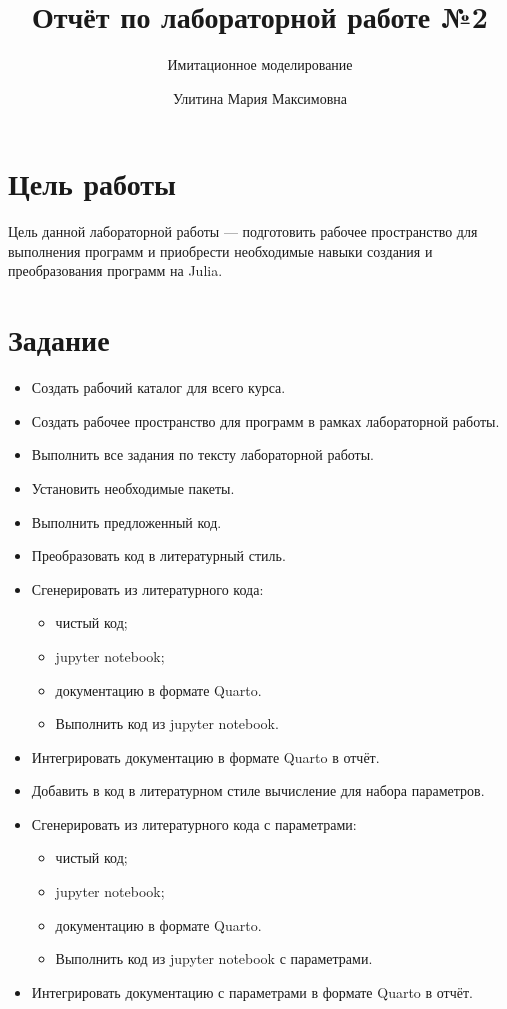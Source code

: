\documentclass[
  english,
  russian,
  12pt,
  a4paper,
  DIV=11,
  numbers=noendperiod]{scrartcl}
\title{Отчёт по лабораторной работе №2}
\subtitle{Имитационное моделирование}
\author{Улитина Мария Максимовна}
\date{}
\providecommand{\tightlist}{%
  \setlength{\itemsep}{0pt}\setlength{\parskip}{0pt}}
\renewcommand*\contentsname{Содержание}
\newcommand\contentsname{Содержание}
\begin{document}
\maketitle

\renewcommand*\contentsname{Содержание}
{
\setcounter{tocdepth}{2}
\tableofcontents
}
\listoffigures
\listoftables

\section{Цель
работы}\label{ux446ux435ux43bux44c-ux440ux430ux431ux43eux442ux44b}

Цель данной лабораторной работы --- подготовить рабочее пространство для
выполнения программ и приобрести необходимые навыки создания и
преобразования программ на Julia.

\section{Задание}\label{ux437ux430ux434ux430ux43dux438ux435}

\begin{itemize}
\tightlist
\item
  Создать рабочий каталог для всего курса.
\item
  Создать рабочее пространство для программ в рамках лабораторной
  работы.
\item
  Выполнить все задания по тексту лабораторной работы.
\item
  Установить необходимые пакеты.
\item
  Выполнить предложенный код.
\item
  Преобразовать код в литературный стиль.
\item
  Сгенерировать из литературного кода:

  \begin{itemize}
  \tightlist
  \item
    чистый код;
  \item
    jupyter notebook;
  \item
    документацию в формате Quarto.
  \item
    Выполнить код из jupyter notebook.
  \end{itemize}
\item
  Интегрировать документацию в формате Quarto в отчёт.
\item
  Добавить в код в литературном стиле вычисление для набора параметров.
\item
  Сгенерировать из литературного кода с параметрами:

  \begin{itemize}
  \tightlist
  \item
    чистый код;
  \item
    jupyter notebook;
  \item
    документацию в формате Quarto.
  \item
    Выполнить код из jupyter notebook с параметрами.
  \end{itemize}
\item
  Интегрировать документацию с параметрами в формате Quarto в отчёт.
\end{itemize}
\end{document}

